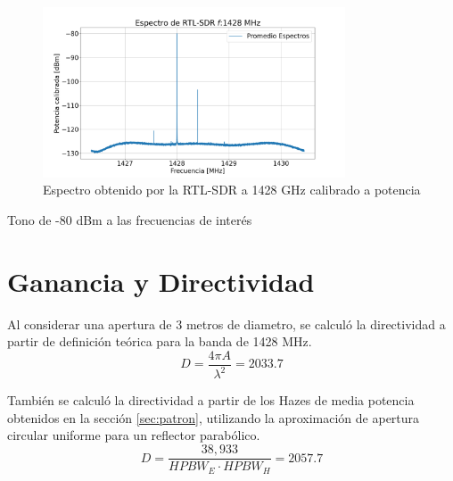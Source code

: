\begin{figure}
    \centering
    \includegraphics[width=0.8\textwidth]{img/rtl1428}
    \caption{Espectro obtenido por la RTL-SDR a 1428 GHz calibrado a potencia}
    \label{fig:rtl1428}
\end{figure}


\begin{images}{Tono de -80 dBm a las frecuencias de interés}

    \imagesnewline


    \imagesnewline


\end{images}

\section{Ganancia y Directividad}

Al considerar una apertura de 3 metros de diametro, se calculó la directividad a partir de definición teórica para la banda de 1428 MHz.\\

\begin{equation}
    D = \frac{4\pi A}{\lambda^2} = 2033.7
\end{equation}

También se calculó la directividad a partir de los Hazes de media potencia obtenidos en la sección \ref{sec:patron}, utilizando la aproximación de apertura circular uniforme para un reflector parabólico.\\

\begin{equation}
    D = \frac{38,933}{HPBW_{E}\cdot HPBW_{H}} = 2057.7
\end{equation}


